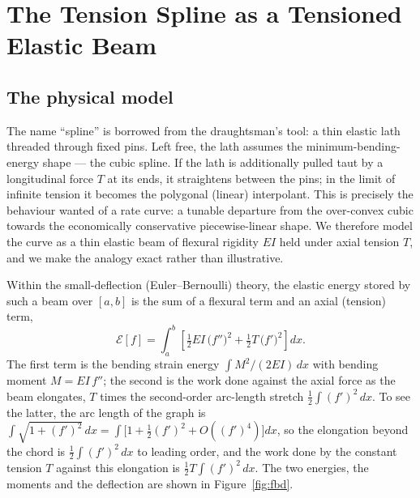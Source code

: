 \documentclass[10pt]{article}
\begin{document}
\section{The Tension Spline as a Tensioned Elastic Beam}\label{sec:tension}
\subsection{The physical model}
The name ``spline'' is borrowed from the draughtsman's tool: a thin elastic lath threaded
through fixed pins. Left free, the lath assumes the minimum-bending-energy shape --- the cubic
spline. If the lath is additionally pulled taut by a longitudinal force $T$ at its ends, it
straightens between the pins; in the limit of infinite tension it becomes the polygonal
(linear) interpolant. This is precisely the behaviour wanted of a rate curve: a tunable
departure from the over-convex cubic towards the economically conservative piecewise-linear
shape. We therefore model the curve as a thin elastic beam of flexural rigidity $EI$ held under
axial tension $T$, and we make the analogy exact rather than illustrative.

Within the small-deflection (Euler--Bernoulli) theory, the elastic energy stored by such a beam
over $[a,b]$ is the sum of a flexural term and an axial (tension) term,
\begin{equation}
\mathcal{E}[f]=\int_a^b\!\left[\tfrac12 EI\,\big(f''\big)^2+\tfrac12 T\,\big(f'\big)^2\right]dx .
\label{eq:functional}
\end{equation}
The first term is the bending strain energy $\int M^2/(2EI)\,dx$ with bending moment
$M=EI\,f''$; the second is the work done against the axial force as the beam elongates,
$T$ times the second-order arc-length stretch $\tfrac12\int (f')^2\,dx$. To see the latter,
the arc length of the graph is $\int\sqrt{1+(f')^2}\,dx=\int\big[1+\tfrac12(f')^2+O((f')^4)\big]dx$,
so the elongation beyond the chord is $\tfrac12\int(f')^2\,dx$ to leading order, and the work
done by the constant tension $T$ against this elongation is $\tfrac12 T\int(f')^2\,dx$. The two
energies, the moments and the deflection are shown in Figure~\ref{fig:fbd}.
\end{document}
